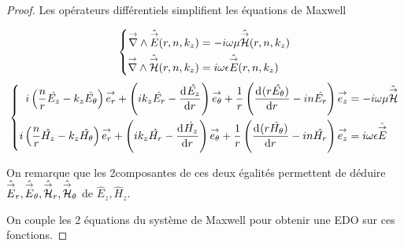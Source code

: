   \begin{proof}

    Les opérateurs différentiels simplifient les équations de Maxwell

    \begin{equation*}
    \left\lbrace \begin{aligned}
      \vrot \hat \vE(r,n,k_z) &=-i\w\mu \hat \vH(r,n,k_z)
      \\
      \vrot \hat \vH(r,n,k_z) &= i\w\eps \hat \vE(r,n,k_z)
    \end{aligned}\right.
    \end{equation*}
    \begin{equation*}
    \left\lbrace \begin{aligned}
      i\left(\frac{n}{r}\hat{E_z} - k_z\hat{E_\theta}\right)\vect{e_r} +
      \left(ik_z\hat{E_r} - \ddp{r}{\hat{E_z}}\right)\vect{e_\theta} +
      \frac{1}{r}\left(\ddp{r}{(r\hat{E_\theta})}-in\hat{E_r}\right)\vect{e_z}
      &=-i\w\mu \hat \vH
      \\
      i\left(\frac{n}{r}\hat{H_z} - k_z\hat{H_\theta}\right)\vect{e_r} +
      \left(ik_z\hat{H_r} - \ddp{r}{\hat{H_z}}\right)\vect{e_\theta} +
      \frac{1}{r}\left(\ddp{r}{(r\hat{H_\theta})}-in\hat{H_r}\right)\vect{e_z}
      &=i\w\eps \hat \vE
    \end{aligned}\right.
    \end{equation*}    %

    On remarque que les 2\ieme composantes de ces deux égalités permettent de déduire \(\hat\vE_r,\hat\vE_\theta, \hat\vH_r,\hat\vH_\theta\) de \(\hat E_z,\hat H_z\).

    On couple les 2 équations du système de Maxwell pour obtenir une EDO sur ces fonctions.




\end{proof}
